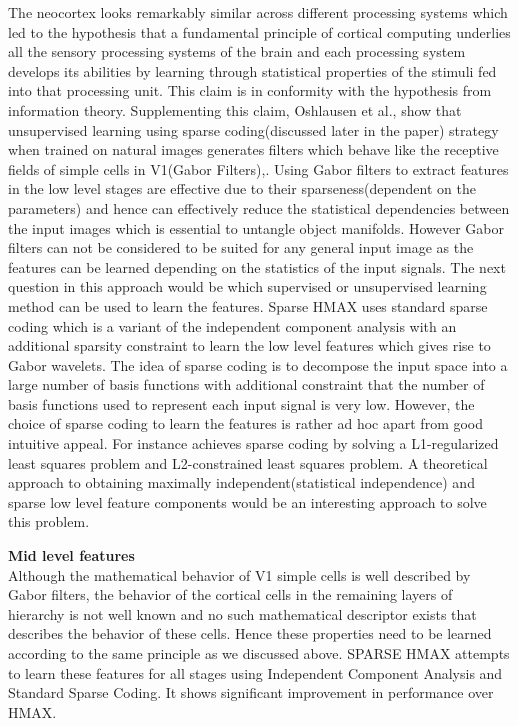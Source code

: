 \documentclass[12pt,twoside]{article}
\theoremstyle{plain}
\theoremstyle{definition}
\theoremstyle{remark}
\begin{document}
The neocortex looks remarkably similar across different processing systems which led to the hypothesis that a fundamental principle of cortical computing underlies all the sensory processing systems\cite{VB1997} of the brain and each processing system develops its abilities by learning through statistical properties of the stimuli fed into that processing unit. This claim is in conformity with the hypothesis from information theory. Supplementing this claim, Oshlausen et al.,\cite{BrunoA.Olshausen1996} show that unsupervised learning using sparse coding(discussed later in the paper) strategy when trained on natural images generates filters which behave like the receptive fields of simple cells in V1(Gabor Filters)\cite{JPJones1987},\cite{Gabor1946}. Using Gabor filters to extract  features in the low level stages are effective due to their sparseness(dependent on the parameters) and hence can effectively reduce the statistical dependencies\cite{BrunoA.Olshausen1996} between the input images which is essential to untangle object manifolds\cite{JamesJ.DiCarlo2007}. However Gabor filters can not be considered to be suited for any general input image as the features can be learned depending on the statistics of the input signals. The next question in this approach would be which supervised or unsupervised learning method can be used to learn the features. Sparse HMAX\citep{XiaolinHu2014} uses standard sparse coding which is a variant of the independent component analysis with an additional sparsity constraint to learn the low level features which gives rise to Gabor wavelets. The idea of sparse coding is to decompose the input space into a large number of basis functions with additional constraint that the number of basis functions used to represent each input signal is very low. However, the choice of sparse coding to learn the features is rather ad hoc apart from good intuitive appeal. For instance \cite{HonglakLee2006} achieves sparse coding by solving a L1-regularized least squares problem and L2-constrained least
squares problem. A theoretical approach to obtaining maximally independent(statistical independence) and sparse low level feature components would be an interesting approach to solve this problem. 

\textbf{Mid level features}\\
Although the mathematical behavior of V1 simple cells is well described by Gabor filters, the behavior of the cortical cells in the remaining layers of hierarchy is not well known and no such mathematical descriptor exists that describes the behavior of these cells. Hence these properties need to be learned according to the same principle as we discussed above. SPARSE HMAX\cite{XiaolinHu2014} attempts to learn these features for all stages using Independent Component Analysis and Standard Sparse Coding\cite{XiaolinHu2014}. It shows significant improvement in performance over HMAX\cite{MaximilianRiesenhuber1999}. 
\end{document}
